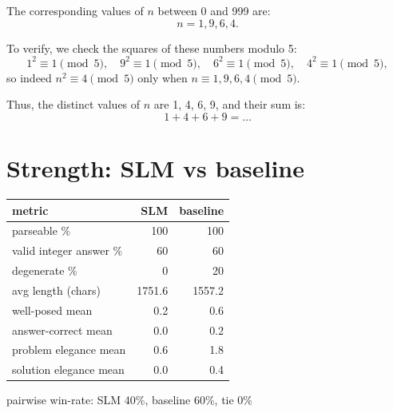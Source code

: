 \documentclass[11pt]{article}
\begin{document}
The corresponding values of \( n \) between 0 and 999 are:
\[ n = 1, 9, 6, 4. \]

To verify, we check the squares of these numbers modulo 5:
\[
1^2 \equiv 1 \pmod{5}, \quad 9^2 \equiv 1 \pmod{5}, \quad 6^2 \equiv 1 \pmod{5}, \quad 4^2 \equiv 1 \pmod{5},
\]
so indeed \( n^2 \equiv 4 \pmod{5} \) only when \( n \equiv 1, 9, 6, 4 \pmod{5} \).

Thus, the distinct values of \( n \) are 1, 4, 6, 9, and their sum is:
\[ 1 + 4 + 6 + 9 = \ldots \]

\section*{Strength: SLM vs baseline}

\begin{tabular}{lrr}

metric & SLM & baseline \\ \hline

parseable \% & 100 & 100 \\

valid integer answer \% & 60 & 60 \\

degenerate \% & 0 & 20 \\

avg length (chars) & 1751.6 & 1557.2 \\

well-posed mean & 0.2 & 0.6 \\

answer-correct mean & 0.0 & 0.2 \\

problem elegance mean & 0.6 & 1.8 \\

solution elegance mean & 0.0 & 0.4 \\

\end{tabular}

\medskip

pairwise win-rate: SLM 40\%, baseline 60\%, tie 0\%
\end{document}
